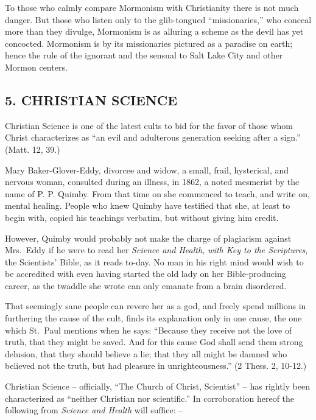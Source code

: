 \documentclass[
]{book}
\begin{document}
To those who calmly compare Mormonism with Christianity there is not much danger. But those who listen only to the glib-tongued ``missionaries,'' who conceal more than they divulge, Mormonism is as alluring a scheme as the devil has yet concocted. Mormonism is by its missionaries pictured as a paradise on earth; hence the rule of the ignorant and the sensual to Salt Lake City and other Mormon centers.

\hypertarget{christian-science}{%
\subsection*{5. CHRISTIAN SCIENCE}\label{christian-science}}

Christian Science is one of the latest cults to bid for the favor of those whom Christ characterizes as ``an evil and adulterous generation seeking after a sign.'' (Matt. 12, 39.)

Mary Baker-Glover-Eddy, divorcee and widow, a small, frail, hysterical, and nervous woman, consulted during an illness, in 1862, a noted mesmerist by the name of P. P. Quimby. From that time on she commenced to teach, and write on, mental healing. People who knew Quimby have testified that she, at least to begin with, copied his teachings verbatim, but without giving him credit.

However, Quimby would probably not make the charge of plagiarism against Mrs.~Eddy if he were to read her \emph{Science and Health, with Key to the Scriptures}, the Scientists' Bible, as it reads to-day. No man in his right mind would wish to be accredited with even having started the old lady on her Bible-producing career, as the twaddle she wrote can only emanate from a brain disordered.

That seemingly sane people can revere her as a god, and freely spend millions in furthering the cause of the cult, finds its explanation only in one cause, the one which St.~Paul mentions when he says: ``Because they receive not the love of truth, that they might be saved. And for this cause God shall send them strong delusion, that they should believe a lie; that they all might be damned who believed not the truth, but had pleasure in unrighteousness.'' (2 Thess. 2, 10-12.)

Christian Science -- officially, ``The Church of Christ, Scientist'' -- has rightly been characterized as ``neither Christian nor scientific.'' In corroboration hereof the following from \emph{Science and Health} will suffice: --
\end{document}
